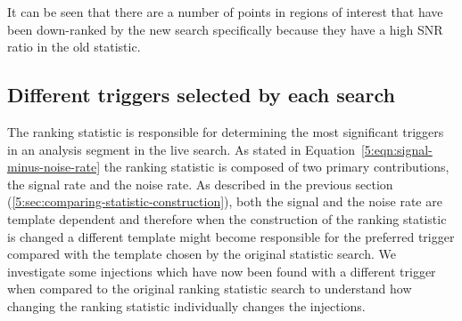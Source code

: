 %
It can be seen that there are a number of points in regions of interest that have been down-ranked by the new search specifically because they have a high SNR ratio in the old statistic.


\subsection{\label{5:sec:diff-triggers}Different triggers selected by each search}

The ranking statistic is responsible for determining the most significant triggers in an analysis segment in the live search. As stated in Equation~\ref{5:eqn:signal-minus-noise-rate} the ranking statistic is composed of two primary contributions, the signal rate and the noise rate. As described in the previous section (\ref{5:sec:comparing-statistic-construction}), both the signal and the noise rate are template dependent and therefore when the construction of the ranking statistic is changed a different template might become responsible for the preferred trigger compared with the template chosen by the original statistic search. We investigate some injections which have now been found with a different trigger when compared to the original ranking statistic search to understand how changing the ranking statistic individually changes the injections.


